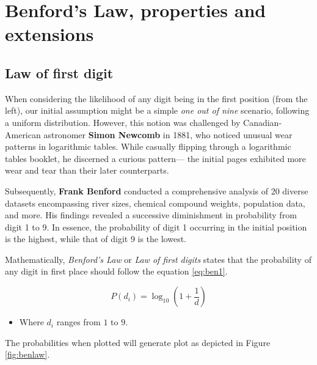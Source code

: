 \documentclass[
]{book}
\providecommand{\tightlist}{%
  \setlength{\itemsep}{0pt}\setlength{\parskip}{0pt}}
\begin{document}
\hypertarget{benfords-law-properties-and-extensions}{%
\section{Benford's Law, properties and extensions}\label{benfords-law-properties-and-extensions}}

\hypertarget{law-of-first-digit}{%
\subsection{Law of first digit}\label{law-of-first-digit}}

When considering the likelihood of any digit being in the first position (from the left), our initial assumption might be a simple \emph{one out of nine} scenario, following a uniform distribution. However, this notion was challenged by Canadian-American astronomer \textbf{Simon Newcomb} in 1881, who noticed unusual wear patterns in logarithmic tables. While casually flipping through a logarithmic tables booklet, he discerned a curious pattern--- the initial pages exhibited more wear and tear than their later counterparts.

Subsequently, \textbf{Frank Benford} conducted a comprehensive analysis of 20 diverse datasets encompassing river sizes, chemical compound weights, population data, and more. His findings revealed a successive diminishment in probability from digit 1 to 9. In essence, the probability of digit 1 occurring in the initial position is the highest, while that of digit 9 is the lowest.

Mathematically, \emph{Benford's Law} or \emph{Law of first digits} states that the probability of any digit in first place should follow the equation \eqref{eq:ben1}.

\begin{equation} 
P(d_i) = \log_{10}\left(1 + \frac{1}{d}\right) 
\label{eq:ben1}
\end{equation}

\begin{itemize}
\tightlist
\item
  Where \(d_i\) ranges from \(1\) to \(9\).
\end{itemize}

The probabilities when plotted will generate plot as depicted in Figure \ref{fig:benlaw}.
\end{document}

